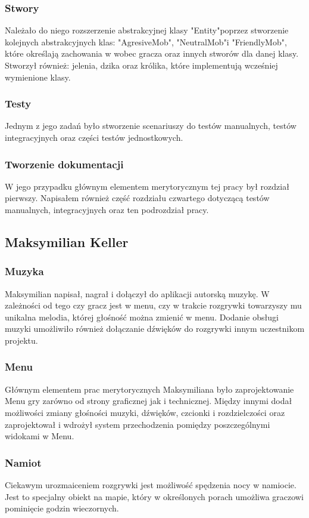 \documentclass{article}
\begin{document}
\subsubsection{Stwory}
Należało do niego rozszerzenie abstrakcyjnej klasy "Entity"\space poprzez stworzenie kolejnych abstrakcyjnych klas: "AgresiveMob", "NeutralMob"\space i "FriendlyMob", które określają zachowania w wobec gracza oraz innych stworów dla danej klasy. Stworzył również: jelenia, dzika oraz królika, które implementują wcześniej wymienione klasy.
\subsubsection{Testy}
Jednym z jego zadań było stworzenie scenariuszy do testów manualnych, testów integracyjnych oraz części testów jednostkowych.
\subsubsection{Tworzenie dokumentacji}
W jego przypadku głównym elementem merytorycznym tej pracy był rozdział pierwszy. Napisałem również część rozdziału czwartego dotyczącą testów manualnych, integracyjnych oraz ten podrozdział pracy.

\subsection{Maksymilian Keller}
\subsubsection{Muzyka}
Maksymilian napisał, nagrał i dołączył do aplikacji autorską muzykę. W zależności od tego czy gracz jest w menu, czy w trakcie rozgrywki towarzyszy mu unikalna melodia, której głośność można zmienić w menu. Dodanie obsługi muzyki umożliwiło również dołączanie dźwięków do rozgrywki innym uczestnikom projektu.

\subsubsection{Menu}
Głównym elementem prac merytorycznych Maksymiliana było zaprojektowanie Menu gry zarówno od strony graficznej jak i technicznej. Między innymi dodał możliwości zmiany głośności muzyki, dźwięków, czcionki i rozdzielczości oraz zaprojektował i wdrożył system przechodzenia pomiędzy poszczególnymi widokami w Menu.

\subsubsection{Namiot}
Ciekawym urozmaiceniem rozgrywki jest możliwość spędzenia nocy w namiocie. Jest to specjalny obiekt na mapie, który w określonych porach umożliwa graczowi pominięcie godzin wieczornych.
\end{document}
